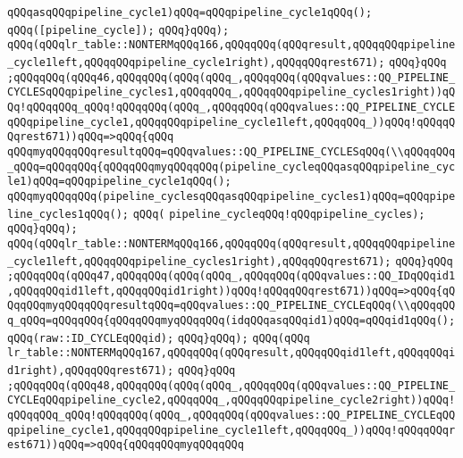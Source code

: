 \verb|qQQqasqQQqpipeline_cycle1)qQQq=qQQqpipeline_cycle1qQQq();|\newline
\verb|qQQq([pipeline_cycle]);|\newline
\verb|qQQq}qQQq);|\newline
\verb|qQQq(qQQqlr_table::NONTERMqQQq166,qQQqqQQq(qQQqresult,qQQqqQQqpipeline_cycle1left,qQQqqQQqpipeline_cycle1right),qQQqqQQqrest671);|\newline
\verb|qQQq}qQQq|\newline
\verb|;qQQqqQQq(qQQq46,qQQqqQQq(qQQq(qQQq_,qQQqqQQq(qQQqvalues::QQ_PIPELINE_CYCLESqQQqpipeline_cycles1,qQQqqQQq_,qQQqqQQqpipeline_cycles1right))qQQq!qQQqqQQq_qQQq!qQQqqQQq(qQQq_,qQQqqQQq(qQQqvalues::QQ_PIPELINE_CYCLEqQQqpipeline_cycle1,qQQqqQQqpipeline_cycle1left,qQQqqQQq_))qQQq!qQQqqQQqrest671))qQQq=>qQQq{qQQq|\newline
\verb|qQQqmyqQQqqQQqresultqQQq=qQQqvalues::QQ_PIPELINE_CYCLESqQQq(\\qQQqqQQq_qQQq=qQQqqQQq{qQQqqQQqmyqQQqqQQq(pipeline_cycleqQQqasqQQqpipeline_cycle1)qQQq=qQQqpipeline_cycle1qQQq();|\newline
\verb|qQQqmyqQQqqQQq(pipeline_cyclesqQQqasqQQqpipeline_cycles1)qQQq=qQQqpipeline_cycles1qQQq();|\newline
\verb|qQQq(|\newline
\verb|pipeline_cycleqQQq!qQQqpipeline_cycles);|\newline
\verb|qQQq}qQQq);|\newline
\verb|qQQq(qQQqlr_table::NONTERMqQQq166,qQQqqQQq(qQQqresult,qQQqqQQqpipeline_cycle1left,qQQqqQQqpipeline_cycles1right),qQQqqQQqrest671);|\newline
\verb|qQQq}qQQq|\newline
\verb|;qQQqqQQq(qQQq47,qQQqqQQq(qQQq(qQQq_,qQQqqQQq(qQQqvalues::QQ_IDqQQqid1,qQQqqQQqid1left,qQQqqQQqid1right))qQQq!qQQqqQQqrest671))qQQq=>qQQq{qQQqqQQqmyqQQqqQQqresultqQQq=qQQqvalues::QQ_PIPELINE_CYCLEqQQq(\\qQQqqQQq_qQQq=qQQqqQQq{qQQqqQQqmyqQQqqQQq(idqQQqasqQQqid1)qQQq=qQQqid1qQQq();|\newline
\verb|qQQq(raw::ID_CYCLEqQQqid);|\newline
\verb|qQQq}qQQq);|\newline
\verb|qQQq(qQQq|\newline
\verb|lr_table::NONTERMqQQq167,qQQqqQQq(qQQqresult,qQQqqQQqid1left,qQQqqQQqid1right),qQQqqQQqrest671);|\newline
\verb|qQQq}qQQq|\newline
\verb|;qQQqqQQq(qQQq48,qQQqqQQq(qQQq(qQQq_,qQQqqQQq(qQQqvalues::QQ_PIPELINE_CYCLEqQQqpipeline_cycle2,qQQqqQQq_,qQQqqQQqpipeline_cycle2right))qQQq!qQQqqQQq_qQQq!qQQqqQQq(qQQq_,qQQqqQQq(qQQqvalues::QQ_PIPELINE_CYCLEqQQqpipeline_cycle1,qQQqqQQqpipeline_cycle1left,qQQqqQQq_))qQQq!qQQqqQQqrest671))qQQq=>qQQq{qQQqqQQqmyqQQqqQQq|\newline

